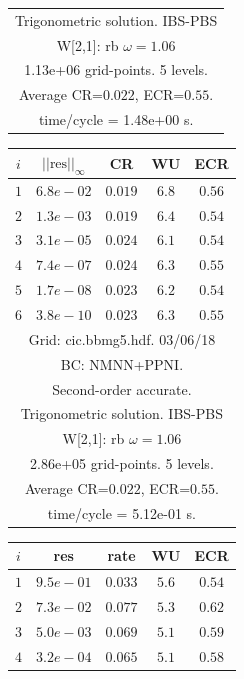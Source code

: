 \begin{table}[hbt]
\begin{center}
{\begin{tabular}{|c|c|c|c|c|}
\multicolumn{5}{|c|}{Trigonometric solution. IBS-PBS}  \\
\multicolumn{5}{|c|}{W[2,1]: rb $\omega=1.06$}  \\
\multicolumn{5}{|c|}{1.13e+06 grid-points. 5 levels.}  \\
\multicolumn{5}{|c|}{Average CR=$0.022$, ECR=$0.55$.}  \\
\multicolumn{5}{|c|}{time/cycle = 1.48e+00 s.}  \\
\hline 
\end{tabular}
\begin{tabular}{|c|c|c|c|c|} \hline 
 $i$   & $\vert\vert\mbox{res}\vert\vert_\infty$  &  CR     &  WU    & ECR  \\   \hline 
 $ 1$  & $ 6.8e-02$ & $0.019$ & $ 6.8$ & $0.56$ \\ 
 $ 2$  & $ 1.3e-03$ & $0.019$ & $ 6.4$ & $0.54$ \\ 
 $ 3$  & $ 3.1e-05$ & $0.024$ & $ 6.1$ & $0.54$ \\ 
 $ 4$  & $ 7.4e-07$ & $0.024$ & $ 6.3$ & $0.55$ \\ 
 $ 5$  & $ 1.7e-08$ & $0.023$ & $ 6.2$ & $0.54$ \\ 
 $ 6$  & $ 3.8e-10$ & $0.023$ & $ 6.3$ & $0.55$ \\ 
\hline 
\multicolumn{5}{|c|}{Grid: cic.bbmg5.hdf. 03/06/18}  \\
\multicolumn{5}{|c|}{BC: NMNN+PPNI.}  \\
\multicolumn{5}{|c|}{Second-order accurate.}  \\
\multicolumn{5}{|c|}{Trigonometric solution. IBS-PBS}  \\
\multicolumn{5}{|c|}{W[2,1]: rb $\omega=1.06$}  \\
\multicolumn{5}{|c|}{2.86e+05 grid-points. 5 levels.}  \\
\multicolumn{5}{|c|}{Average CR=$0.022$, ECR=$0.55$.}  \\
\multicolumn{5}{|c|}{time/cycle = 5.12e-01 s.}  \\
\hline 
\end{tabular}
\begin{tabular}{|c|c|c|c|c|} \hline 
 $i$   & res      & rate    &  WU    & ECR  \\   \hline 
 $ 1$  & $ 9.5e-01$ & $0.033$ & $ 5.6$ & $0.54$ \\ 
 $ 2$  & $ 7.3e-02$ & $0.077$ & $ 5.3$ & $0.62$ \\ 
 $ 3$  & $ 5.0e-03$ & $0.069$ & $ 5.1$ & $0.59$ \\ 
 $ 4$  & $ 3.2e-04$ & $0.065$ & $ 5.1$ & $0.58$ \\ 

\end{tabular}}
\end{center}
\end{table}
